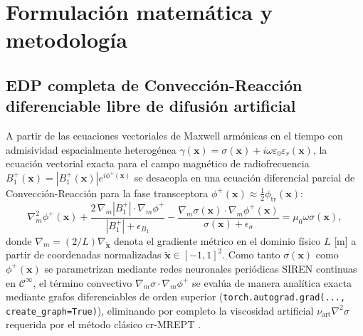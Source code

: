 \documentclass[9pt]{article}
\begin{document}
\section{Formulación matemática y metodología}
\label{sec:metodologia}

\subsection{EDP completa de Convección-Reacción diferenciable libre de difusión artificial}
A partir de las ecuaciones vectoriales de Maxwell armónicas en el tiempo con admisividad espacialmente heterogénea $\gamma(\mathbf{x}) = \sigma(\mathbf{x}) + i\omega\varepsilon_0\varepsilon_r(\mathbf{x})$, la ecuación vectorial exacta para el campo magnético de radiofrecuencia $B_1^+(\mathbf{x}) = |B_1^+(\mathbf{x})|e^{i\phi^+(\mathbf{x})}$ se desacopla en una ecuación diferencial parcial de Convección-Reacción para la fase transceptora $\phi^+(\mathbf{x}) \approx \frac{1}{2}\phi_{\text{tr}}(\mathbf{x})$:
\begin{equation}
\nabla_m^2 \phi^+(\mathbf{x}) + \frac{2\,\nabla_m |B_1^+| \cdot \nabla_m \phi^+}{|B_1^+| + \epsilon_{B_1}} - \frac{\nabla_m \sigma(\mathbf{x}) \cdot \nabla_m \phi^+(\mathbf{x})}{\sigma(\mathbf{x}) + \epsilon_\sigma} = \mu_0 \omega \sigma(\mathbf{x}),
\label{eq:cr_ept_phase}
\end{equation}
donde $\nabla_m = (2/L)\nabla_{\tilde{\mathbf{x}}}$ denota el gradiente métrico en el dominio físico $L$ [$\text{m}$] a partir de coordenadas normalizadas $\tilde{\mathbf{x}} \in [-1, 1]^2$. Como tanto $\sigma(\mathbf{x})$ como $\phi^+(\mathbf{x})$ se parametrizan mediante redes neuronales periódicas SIREN \parencite{Sitzmann2020} continuas en $\mathcal{C}^\infty$, el término convectivo $\nabla_m\sigma\cdot\nabla_m\phi^+$ se evalúa de manera analítica exacta mediante grafos diferenciables de orden superior (\texttt{torch.autograd.grad(..., create\_graph=True)}), eliminando por completo la viscosidad artificial $\nu_{\text{art}}\nabla^2\sigma$ requerida por el método clásico cr-MREPT \parencite{Hafalir2014}.
\end{document}
